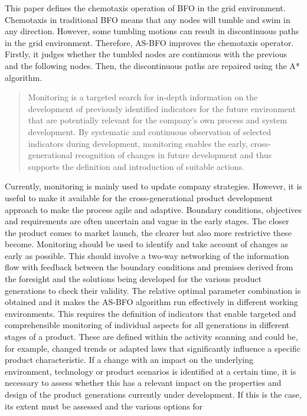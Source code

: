 \documentclass{PDS}%
\theoremstyle{definition}
\begin{document}
This paper defines the chemotaxis operation of BFO in the grid environment. Chemotaxis in
traditional BFO means that any nodes will tumble and swim in any direction. However, some
tumbling motions can result in discontinuous paths in the grid environment. Therefore, AS-BFO
improves the chemotaxis operator. Firstly, it judges whether the tumbled nodes are
continuous with the previous and the following nodes. Then, the discontinuous paths are
repaired using the A* algorithm.
\begin{quote}
Monitoring is a targeted search for in-depth information on the development of
previously identified indicators for the future environment that are potentially relevant
for the company's own process and system development. By systematic and continuous
observation of selected indicators during development, monitoring enables the early,
cross-generational recognition of changes in future development and thus supports the
definition and introduction of suitable actions.
\end{quote}
Currently, monitoring is mainly used to update company strategies. However, it is useful to make it
available for the cross-generational product development approach to make the process agile and
adaptive. Boundary conditions, objectives and requirements are often uncertain and vague in the early
stages. The closer the product comes to market launch, the clearer but also more restrictive these
become. Monitoring should be used to identify and take account of changes as early as possible. This
should involve a two-way networking of the information flow with feedback between the boundary
conditions and premises derived from the foresight and the solutions being developed for the various
product generations to check their validity. The relative optimal parameter combination is obtained and it makes the AS-BFO algorithm
run effectively in different working environments. This requires the definition of indicators that enable targeted
and comprehensible monitoring of individual aspects for all generations in different stages of a product.
These are defined within the activity scanning and could be, for example, changed trends or adapted
laws that significantly influence a specific product characteristic. If a change with an impact on the
underlying environment, technology or product scenarios is identified at a certain time, it is necessary
to assess whether this has a relevant impact on the properties and design of the product generations
currently under development. If this is the case, its extent must be assessed and the various options for
\end{document}
